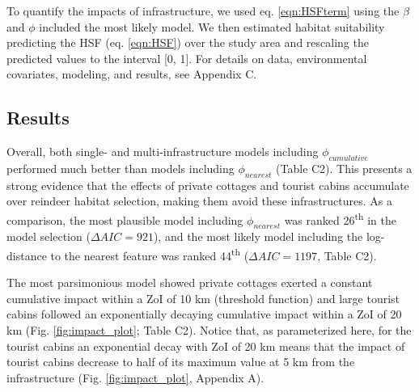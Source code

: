 \documentclass[titlepage]{article}
\begin{document}
To quantify the impacts of infrastructure, we used eq. \ref{eqn:HSFterm} using the $\beta$ and $\phi$ included the most likely model. We then estimated habitat suitability predicting the HSF (eq. \ref{eqn:HSF}) over the study area and rescaling the predicted values to the interval [0, 1]. For details on data, environmental covariates, modeling, and results, see Appendix C.

\subsection{Results}

Overall, both single- and multi-infrastructure models including $\phi_{cumulative}$ performed much better than models including $\phi_{nearest}$ (Table C2). This presents a strong evidence that the effects of private cottages and tourist cabins accumulate over reindeer habitat selection, making them avoid these infrastructures. As a comparison, the most plausible model including $\phi_{nearest}$ was ranked 26\textsuperscript{th} in the model selection ($\Delta AIC = 921$), and the most likely model including the log-distance to the nearest feature was ranked 44\textsuperscript{th} ($\Delta AIC = 1197$, Table C2).

The most parsimonious model showed private cottages exerted a constant cumulative impact within a ZoI of 10 km (threshold function) and large tourist cabins followed an exponentially decaying cumulative impact within a ZoI of 20 km (Fig. \ref{fig:impact_plot}; Table C2). Notice that, as parameterized here, for the tourist cabins an exponential decay with ZoI of 20 km means
that the impact of tourist cabins decrease to half of its maximum value
at 5 km from the infrastructure (Fig. \ref{fig:impact_plot}, Appendix A). 
\end{document}
